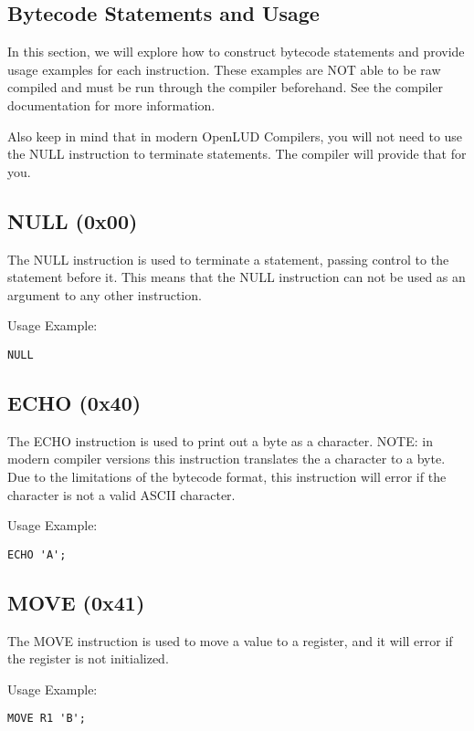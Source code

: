 \documentclass{article}
\begin{document}
\pagebreak


\subsection{Bytecode Statements and Usage}

In this section, we will explore how to construct bytecode statements and
provide usage examples for each instruction. These examples are NOT able to be
raw compiled and must be run through the compiler beforehand. See the
compiler documentation for more information.

Also keep in mind that in modern OpenLUD Compilers, you will not need to use the
NULL instruction to terminate statements. The compiler will provide that for you.

\subsection{NULL (0x00)}
The NULL instruction is used to terminate a statement, passing control to the
statement before it. This means that the NULL instruction can not be used as an
argument to any other instruction.


Usage Example:
\begin{verbatim}
NULL
\end{verbatim}

\subsection{ECHO (0x40)}
The ECHO instruction is used to print out a byte as a character. NOTE: in modern
compiler versions this instruction translates the a character to a byte. Due to
the limitations of the bytecode format, this instruction will error if the
character is not a valid ASCII character.

Usage Example:
\begin{verbatim}
ECHO 'A';
\end{verbatim}

\subsection{MOVE (0x41)}
The MOVE instruction is used to move a value to a register, and it will error if the register is not initialized.

Usage Example:
\begin{verbatim}
MOVE R1 'B';
\end{verbatim}
\end{document}

